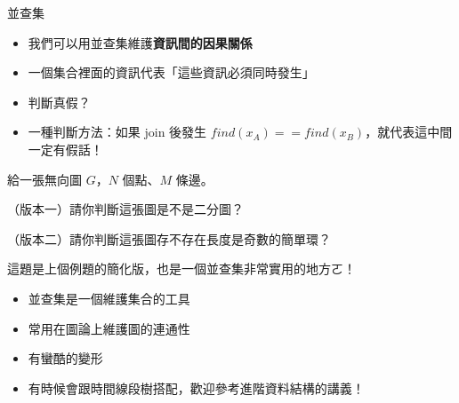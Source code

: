 \documentclass[standalone]{beamer}
\begin{document}
\begin{frame}{並查集}
  \begin{itemize}
    \item 我們可以用並查集維護\textbf{資訊間的因果關係}
    \item 一個集合裡面的資訊代表「這些資訊必須同時發生」
    \item 判斷真假？
    \item 一種判斷方法：如果 join 後發生 $find(x_A) == find(x_B)$，就代表這中間一定有假話！
  \end{itemize}
\end{frame}

\begin{frame}{}
  \begin{problem}[經典問題]
    給一張無向圖 $G$，$N$ 個點、$M$ 條邊。
    
    （版本一）請你判斷這張圖是不是二分圖？

    （版本二）請你判斷這張圖存不存在長度是奇數的簡單環？
  \end{problem}

  這題是上個例題的簡化版，也是一個並查集非常實用的地方ㄛ！
\end{frame}

\begin{frame}{}
  \begin{itemize}
    \item 並查集是一個維護集合的工具
    \item 常用在圖論上維護圖的連通性
    \item 有蠻酷的變形
    \item 有時候會跟時間線段樹搭配，歡迎參考進階資料結構的講義！
  \end{itemize}
\end{frame}
\end{document}
